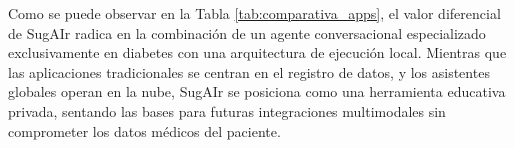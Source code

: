 Como se puede observar en la Tabla \ref{tab:comparativa_apps}, el valor diferencial de SugAIr radica en la combinación de un agente conversacional especializado exclusivamente en diabetes con una arquitectura de ejecución local. Mientras que las aplicaciones tradicionales se centran en el registro de datos, y los asistentes globales operan en la nube, SugAIr se posiciona como una herramienta educativa privada, sentando las bases para futuras integraciones multimodales sin comprometer los datos médicos del paciente.


